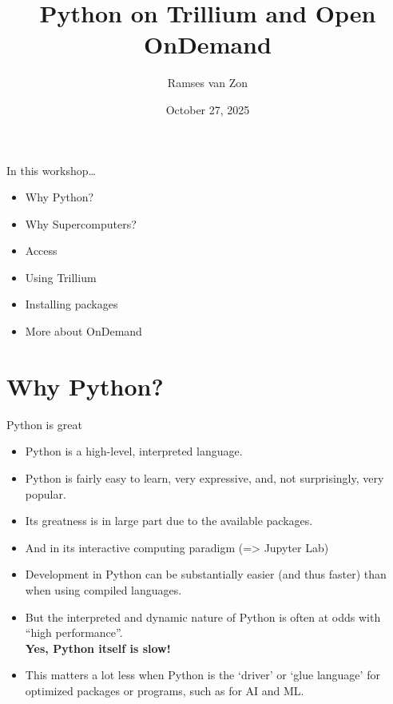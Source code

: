 \documentclass[
  10pt,
  ignorenonframetext,
  aspectratio=169,handout]{beamer}
\title{Python on Trillium and Open OnDemand}
\author{Ramses van Zon}
\date{October 27, 2025}
\begin{document}
\frame{\titlepage}

\begin{frame}{In this workshop\ldots{}}
\label{in-this-workshop}
\begin{itemize}
\item
  Why Python?
\item
  Why Supercomputers?
\item
  Access
\item
  Using Trillium
\item
  Installing packages
\item
  More about OnDemand
\end{itemize}
\end{frame}

\section{Why Python?}\label{why-python}

\begin{frame}{Python is great}
\label{python-is-great}
\begin{itemize}
\item
  Python is a high-level, interpreted language.

  \pause
\item
  Python is fairly easy to learn, very expressive, and, not surprisingly, very popular.

  \pause
\item
  Its greatness is in large part due to the available packages.

  \pause
\item
  And in its interactive computing paradigm (=\textgreater{} Jupyter Lab)

  \pause
\item
  Development in Python can be substantially easier (and thus faster) than when using compiled languages.

  \pause
\item
  But the interpreted and dynamic nature of Python is often at odds with ``high performance''.\\
  \textbf{Yes, Python itself is slow!}

  \pause
\item
  This matters a lot less when Python is the `driver' or `glue language' for optimized packages or programs, such as for AI and ML.
\end{itemize}
\end{frame}
\end{document}
